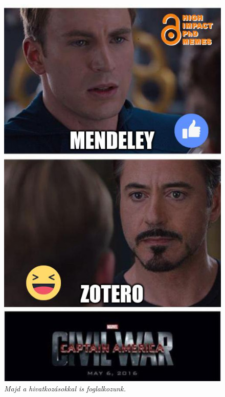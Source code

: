 \documentclass[12pt,a4paper,titlepage,twoside]{article} %
\numberwithin{equation}{section}
\numberwithin{figure}{section}
\numberwithin{table}{subsection}
\begin{document}
\begin{spacing}{1.5}
\begin{figure}[ptbh]
	\centering
	\includegraphics[scale=0.5]{figs/73040522_2454641708113478_5235417163610718208_n.jpg}
	\caption{\textit{Majd a hivatkozásokkal is foglalkozunk.}}
	\label{fig:references}
\end{figure}


\end{spacing}
\end{document}

